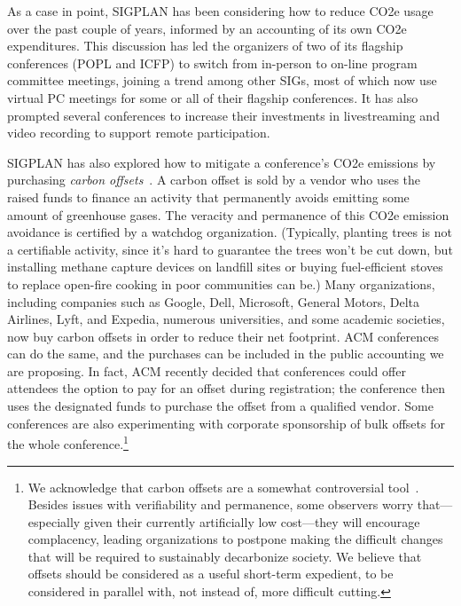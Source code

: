 \documentclass[12pt]{article}
\begin{document}
As a case in point, SIGPLAN has been considering how to reduce CO2e usage
over the past couple of years, informed by an accounting of its own CO2e
expenditures. This discussion has led the organizers of two of its flagship
conferences (POPL and ICFP) to switch from in-person to on-line program
committee meetings, joining a trend among other SIGs, most of which now use
virtual PC meetings for some or all of their flagship conferences. It has
also prompted several conferences to increase their investments in
livestreaming and video recording to support remote participation.

SIGPLAN has also explored how to mitigate a conference's CO2e emissions by
purchasing \emph{carbon offsets}~\cite{CarbonOFfsetReport}.
%
A carbon offset is sold by a vendor who uses the raised funds to finance an
activity that permanently avoids emitting some amount of greenhouse gases.
The veracity and permanence of this CO2e emission avoidance is certified by
a watchdog organization. (Typically, planting trees is not a certifiable
activity, since it's hard to guarantee the trees won't be cut down, but
installing methane capture devices on landfill sites or buying
fuel-efficient stoves to replace open-fire cooking in poor communities can
be.)
%
Many organizations, including companies such as Google, Dell, Microsoft,
General Motors, Delta Airlines, Lyft, and Expedia, numerous universities,
and some academic societies, now buy carbon offsets in order to reduce their
net footprint. ACM conferences can do the same, and the purchases can be
included in the public accounting we are proposing.  In fact, ACM recently
decided that conferences could offer attendees the option to pay for an
offset during registration; the conference then uses the designated funds to
purchase the offset from a qualified vendor.  Some conferences are also
experimenting with corporate sponsorship of bulk offsets for the whole
conference.\footnote{We acknowledge that carbon offsets are a somewhat
  controversial 
  tool~\cite{anderson2012inconvenient,
  carbon-offsets-are-not-our-get-out-jail-free-card}.  Besides issues with
  verifiability and permanence, some observers worry that---especially given
  their currently artificially low cost---they will encourage complacency,
  leading organizations to postpone making the difficult changes that will
  be required to sustainably decarbonize society.  We believe that offsets
  should be considered as a useful short-term expedient, to be considered in
  parallel with, not instead of, more difficult cutting.}
\end{document}
